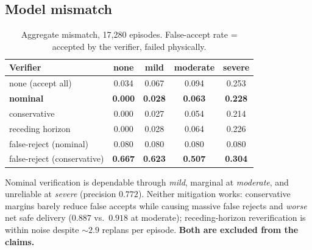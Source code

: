 \documentclass[11pt]{article}
\begin{document}
\subsection{Model mismatch}

\begin{table}[htbp]\centering
\caption{Aggregate mismatch, 17{,}280 episodes. False-accept rate = accepted by
the verifier, failed physically.}
\begin{tabular}{lcccc}
\toprule
Verifier & none & mild & moderate & severe \\
\midrule
none (accept all)      & 0.034 & 0.067 & 0.094 & 0.253 \\
\textbf{nominal}       & \textbf{0.000} & \textbf{0.028} & \textbf{0.063} & \textbf{0.228} \\
conservative           & 0.000 & 0.027 & 0.054 & 0.214 \\
receding horizon       & 0.000 & 0.028 & 0.064 & 0.226 \\
\midrule
false-reject (nominal) & 0.080 & 0.080 & 0.080 & 0.080 \\
false-reject (conservative) & \textbf{0.667} & \textbf{0.623} & \textbf{0.507} & \textbf{0.304} \\
\bottomrule
\end{tabular}
\end{table}

Nominal verification is dependable through \emph{mild}, marginal at
\emph{moderate}, and unreliable at \emph{severe} (precision $0.772$). Neither
mitigation works: conservative margins barely reduce false accepts while causing
massive false rejects and \emph{worse} net safe delivery ($0.887$ vs.\ $0.918$
at moderate); receding-horizon reverification is within noise despite
$\sim\!2.9$ replans per episode. \textbf{Both are excluded from the claims.}
\end{document}
